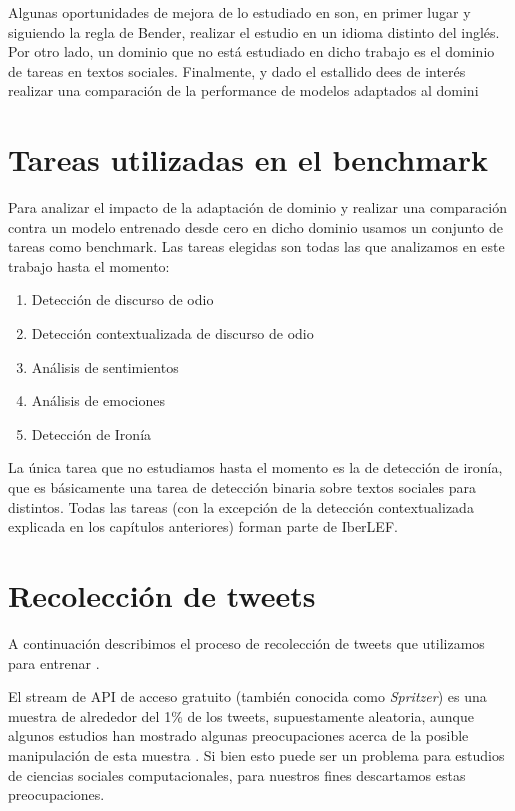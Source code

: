 Algunas oportunidades de mejora de lo estudiado en \citet{gururangan-etal-2020-dont} son, en primer lugar y siguiendo la regla de Bender\cite{bender2011achieving}, realizar el estudio en un idioma distinto del inglés. Por otro lado, un dominio que no está estudiado en dicho trabajo es el dominio de tareas en textos sociales. Finalmente, y dado el estallido dees de interés realizar una comparación de la performance de modelos adaptados al domini

\section{Tareas utilizadas en el benchmark}

Para analizar el impacto de la adaptación de dominio y realizar una comparación contra un modelo entrenado desde cero en dicho dominio usamos un conjunto de tareas como benchmark. Las tareas elegidas son todas las que analizamos en este trabajo hasta el momento:

\begin{enumerate}
    \item Detección de discurso de odio
    \item Detección contextualizada de discurso de odio
    \item Análisis de sentimientos
    \item Análisis de emociones
    \item Detección de Ironía
\end{enumerate}

La única tarea que no estudiamos hasta el momento es la de detección de ironía, que es básicamente una tarea de detección binaria sobre textos sociales para distintos. Todas las tareas (con la excepción de la detección contextualizada explicada en los capítulos anteriores) forman parte de IberLEF.

\section{Recolección de tweets}

A continuación describimos el proceso de recolección de tweets que utilizamos para entrenar \robertuito{}.

El stream de API de acceso gratuito (también conocida como \emph{Spritzer}) es una muestra de alrededor del 1\% de los tweets, supuestamente aleatoria, aunque algunos estudios han mostrado algunas preocupaciones acerca de la posible manipulación de esta muestra \cite{pfeffer2018tampering}. Si bien esto puede ser un problema para estudios de ciencias sociales computacionales, para nuestros fines descartamos estas preocupaciones.

